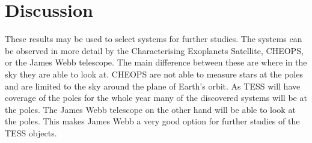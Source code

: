 \documentclass[12pt]{report}
\begin{document}

\chapter{Discussion}
	These results may be used to select systems for further studies. The systems can be observed in more detail by the Characterising Exoplanets Satellite, CHEOPS, or the James Webb telescope. The main difference between these are where in the sky they are able to look at. CHEOPS are not able to measure stars at the poles and are limited to the sky around the plane of Earth's orbit. As TESS will have coverage of the poles for the whole year many of the discovered systems will be at the poles. The James Webb telescope on the other hand will be able to look at the poles. This makes James Webb a very good option for further studies of the TESS objects. 
	
\end{document}

